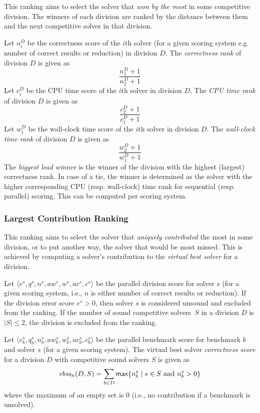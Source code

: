 \documentclass[12pt]{article}
\begin{document}
This ranking aims to select the solver that \emph{won by the most} in
some competitive division. The winners of each division are ranked by
the distance between them and the next competitive solver in that
division.

Let $n_i^D$ be the correctness score of the $i$th solver (for a given scoring
system e.g. number of correct results or reduction) in division $D$.
The \emph{correctness rank} of division $D$ is given as
\[
\frac{n_1^D+1}{n_2^D+1}
\]
Let $c_i^D$ be the CPU time score of the $i$th solver in division $D$.
The \emph{CPU time rank} of division $D$ is given as
\vspace{-1ex}
\[
\frac{c_2^D+1}{c_1^D+1}
\]
Let $w_i^D$ be the wall-clock time score of the $i$th solver in division $D$.
The \emph{wall-clock time rank} of division $D$ is given as
\vspace{-1ex}
\[
\frac{w_2^D+1}{w_1^D+1}
\]
The \emph{biggest lead winner} is the winner of the division with the highest
(largest) correctness rank. In case of a tie, the winner is determined as the
solver with the higher corresponding CPU (resp. wall-clock) time rank for
sequential (resp. parallel) scoring.
This can be computed per scoring system.

\subsubsection{Largest Contribution Ranking}

This ranking aims to select the solver that \emph{uniquely
contributed} the most in some division, or to put another way, the
solver that would be most missed. This is achieved by computing a
solver's contribution to the \emph{virtual best solver} for a
division.

Let $\langle e^s, q^s, n^s, \mathit{aw}^s, w^s, \mathit{ac}^s, c^s \rangle$ be the parallel division score
for solver $s$ (for a given scoring system, i.e., $n$ is either number of correct
results or reduction).
If the division error score $e^s > 0$, then solver $s$ is considered unsound
and excluded from the ranking.
If the number of sound competitive solvers~$S$ in a division $D$ is $|S| \leq 2$,
the division is excluded from the ranking.

Let $\langle e_b^s, q_b^s, n_b^s, \mathit{aw}_b^s, w_b^s, \mathit{ac}_b^s, c_b^s \rangle$ be the parallel benchmark
score for benchmark $b$ and solver $s$ (for a given scoring system).
The virtual best solver \emph{correctness score} for a division $D$ with
competitive sound solvers $S$ is given as
\[
\mathit{vbss}_n(D,S) = \sum_{b \in D} {\sf max}\{ n_b^s \mid s \in S \text{ and } n_b^s > 0 \}
\]
where the maximum of an empty set is 0 (i.e., no contribution if a benchmark
is unsolved).
\end{document}
